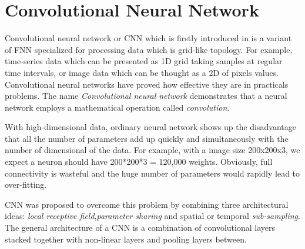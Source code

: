 \section{Convolutional Neural Network}
\hspace{0.5cm}
Convolutional neural network or CNN which is firstly introduced in \cite{cnn} is a variant of FNN specialized 
for processing data which is grid-like topology. For example, time-series data which can be presented as 1D grid 
taking samples at regular time intervals, or image data which can be thought as a 2D of pixels values. Convolutional neural networks have proved how effective they are in practicals problems. 
The name \textit{Convolutional neural network} demonstrates that a neural network employs a mathematical operation called \textit{convolution}.\par
With high-dimensional data, ordinary neural network shows up the disadvantage that all the number of parameters add up quickly and simultaneously with the number of dimensional of the data. For example, with a image size 200x200x3, we expect a neuron should have 200*200*3 = 120,000 weights. Obviously, full connectivity is wasteful and the huge number of parameters would rapidly lead to over-fitting.\par
CNN was proposed to overcome this problem by combining three architectural ideas: \textit{local receptive field},\textit{parameter sharing} and spatial or temporal \textit{sub-sampling}. The general architecture of a CNN is a combination of convolutional layers stacked together with non-linear layers and pooling layers between.
